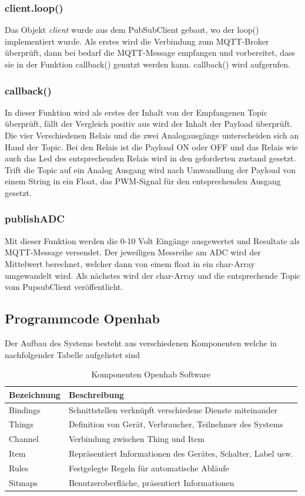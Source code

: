 \subsubsection{client.loop()}
 Das Objekt \textit{client} wurde aus dem PubSubClient gebaut, wo der loop() implementiert wurde. Als erstes wird die Verbindung zum MQTT-Broker überprüft, dann bei bedarf die MQTT-Message empfangen und vorbereitet, dass sie in der Funktion callback()  genutzt werden kann. callback() wird aufgerufen.
 \subsubsection{callback()}
 In dieser Funktion wird als erstes der Inhalt von der Empfangenen Topic überprüft, fällt der Vergleich positiv aus wird der Inhalt der Payload überprüft. Die vier Verschiedenen Relais und die zwei Analogausgänge unterscheiden sich an Hand der Topic. Bei den Relais ist die Payload ON oder OFF und das Relais wie auch das Led des entsprechenden Relais wird in den geforderten zustand gesetzt. Trift die Topic auf ein Analog Ausgang wird nach Umwandlung der Payloud von einem String in ein Float, das PWM-Signal für den entsprechenden Ausgang gesetzt.
 \subsubsection{publishADC}
Mit dieser Funktion werden die 0-10 Volt Eingänge ausgewertet und Resultate als MQTT-Message versendet. Der jeweiligen Messreihe am ADC wird der Mittelwert berechnet, welcher dann von einem float in ein char-Array umgewandelt wird. Als nächstes wird der char-Array und die entsprechende Topic vom PupsubClient veröffentlicht.

\newpage

\subsection{Programmcode Openhab}        
Der Aufbau des Systems besteht aus verschiedenen Komponenten welche in nachfolgender Tabelle aufgelistet sind
\begin{table}[H]
	\begin{tabular}{|l|l|}
		\hline 
		Bezeichnung	& Beschreibung \\ 
		\hline 
		Bindings	& Schnittstellen verknüpft verschiedene Dienste miteinander  \\ 
		\hline 
		Things	& Definition von Gerät, Verbraucher, Teilnehmer des Systems  \\ 
		\hline 
		Channel	& Verbindung zwischen Thing und Item  \\ 
		\hline 
		Item	& Repräsentiert Informationen des Gerätes, Schalter, Label usw. \\ 
		\hline 
		Rules	& Festgelegte Regeln für automatische Abläufe\\ 
		\hline 
		Sitmaps	& Benutzeroberfläche, präsentiert Informationen  \\ 
		\hline 
	\end{tabular} 
	\caption{Komponenten Openhab Software}
	\label{tab: Komponenten Openhab Software}
\end{table}

